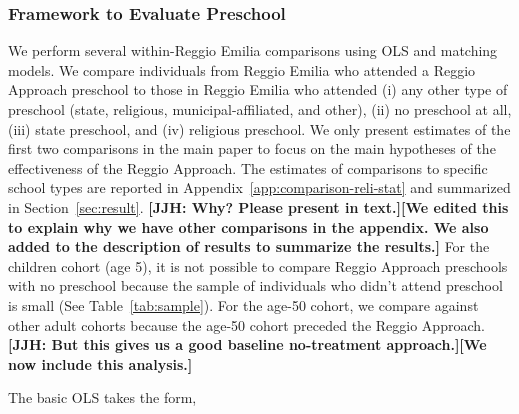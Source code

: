 \subsubsection{Framework to Evaluate Preschool} 
\label{subsubsection:OLS-Preschool}

We perform several within-Reggio Emilia comparisons using OLS and matching models. We compare individuals from Reggio Emilia who attended a Reggio Approach preschool to those in Reggio Emilia who attended (i) any other type of preschool (state, religious, municipal-affiliated, and other), (ii) no preschool at all, (iii) state preschool, and (iv) religious preschool. We only present estimates of the first two comparisons in the main paper to focus on the main hypotheses of the effectiveness of the Reggio Approach. The estimates of comparisons to specific school types are reported in Appendix~\ref{app:comparison-reli-stat} and summarized in Section~\ref{sec:result}. \textbf{[JJH: Why? Please present in text.][We edited this to explain why we have other comparisons in the appendix. We also added to the description of results to summarize the results.]} For the children cohort (age 5), it is not possible to compare Reggio Approach preschools with no preschool because the sample of individuals who didn't attend preschool is small (See Table~\ref{tab:sample}). For the age-50 cohort, we compare against other adult cohorts because the age-50 cohort preceded the Reggio Approach. \textbf{[JJH: But this gives us a good baseline no-treatment approach.][We now include this analysis.]}

The basic OLS takes the form,

